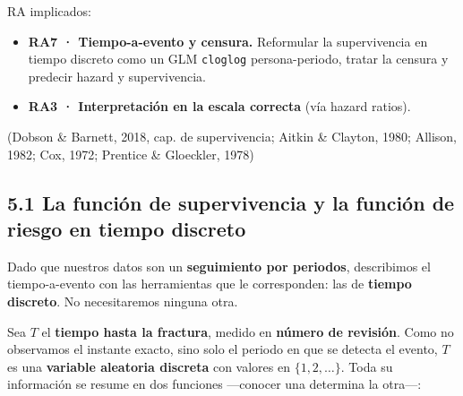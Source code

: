 \documentclass[
  letterpaper,
  DIV=11,
  numbers=noendperiod]{scrartcl}
\providecommand{\tightlist}{%
  \setlength{\itemsep}{0pt}\setlength{\parskip}{0pt}}\usepackage{longtable,booktabs,array}
\begin{document}
\begin{tcolorbox}[enhanced jigsaw, coltitle=black, rightrule=.15mm, arc=.35mm, leftrule=.75mm, colback=white, colbacktitle=quarto-callout-note-color!10!white, left=2mm, breakable, toptitle=1mm, toprule=.15mm, bottomtitle=1mm, titlerule=0mm, title=\textcolor{quarto-callout-note-color}{\faInfo}\hspace{0.5em}{Sobre esta unidad}, bottomrule=.15mm, opacityback=0, opacitybacktitle=0.6, colframe=quarto-callout-note-color-frame]

RA implicados:

\begin{itemize}
\tightlist
\item
  \textbf{RA7 · Tiempo-a-evento y censura.} Reformular la supervivencia
  en tiempo discreto como un GLM \texttt{cloglog} persona-periodo,
  tratar la censura y predecir hazard y supervivencia.
\item
  \textbf{RA3 · Interpretación en la escala correcta} (vía hazard
  ratios).
\end{itemize}

(Dobson \& Barnett, 2018, cap. de supervivencia; Aitkin \& Clayton,
1980; Allison, 1982; Cox, 1972; Prentice \& Gloeckler, 1978)

\end{tcolorbox}

\hypertarget{sec-u15-hazard}{%
\subsection{5.1 La función de supervivencia y la función de riesgo en
tiempo discreto}\label{sec-u15-hazard}}

Dado que nuestros datos son un \textbf{seguimiento por periodos},
describimos el tiempo-a-evento con las herramientas que le corresponden:
las de \textbf{tiempo discreto}. No necesitaremos ninguna otra.

Sea \(T\) el \textbf{tiempo hasta la fractura}, medido en \textbf{número
de revisión}. Como no observamos el instante exacto, sino solo el
periodo en que se detecta el evento, \(T\) es una \textbf{variable
aleatoria discreta} con valores en \(\{1,2,\dots\}\). Toda su
información se resume en dos funciones ---conocer una determina la
otra---:
\end{document}
